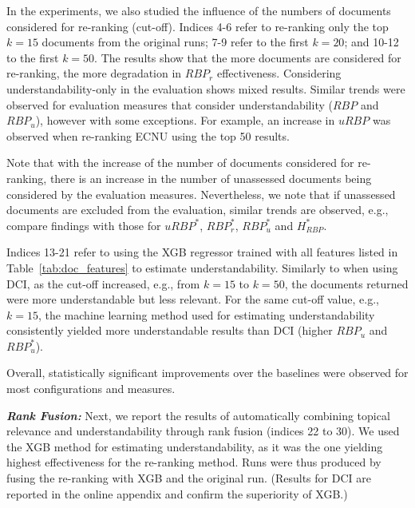 In the experiments, we also studied the influence of the numbers of documents considered for re-ranking (cut-off). Indices 4-6 refer to re-ranking only the top $k=15$ documents from the original runs; 7-9 refer to the first $k=20$; and 10-12 to the first $k=50$. The results show that the more documents are considered for re-ranking, the more degradation in $RBP_r$ effectiveness. Considering understandability-only in the evaluation shows mixed results. Similar trends were observed for evaluation measures that consider understandability ($RBP$ and $RBP_u$), however with some exceptions. For example, an increase in $uRBP$ was observed when re-ranking ECNU using the top 50 results. 

Note that with the increase of the number of documents considered for re-ranking, there is an increase in the number of unassessed documents being considered by the evaluation measures. 
Nevertheless, we note that if unassessed documents are excluded from the evaluation, similar trends are observed, e.g., compare findings with those for $uRBP^*$, $RBP_r^*$, $RBP_u^*$ and $H_{RBP}^*$.

Indices 13-21 refer to using the XGB regressor trained with all features listed in Table~\ref{tab:doc_features} to estimate understandability. Similarly to when using DCI, as the cut-off increased, e.g., from $k=15$ to $k=50$, the documents returned were more understandable but less relevant. For the same cut-off value, e.g., $k=15$, the machine learning method used for estimating understandability consistently yielded more understandable results than DCI (higher $RBP_u$ and $RBP_u^*$). 

Overall, statistically significant improvements over the baselines were observed for most configurations and measures.  


\textit{\textbf{Rank Fusion:}} Next, we report the results of automatically combining topical relevance and understandability through rank fusion (indices 22 to 30). We used the XGB method for estimating understandability, as it was the one yielding highest effectiveness for the re-ranking method. Runs were thus produced by fusing the re-ranking with XGB and the original run. (Results for DCI are reported in the online appendix and confirm the superiority of XGB.) 

